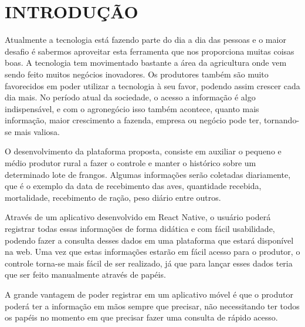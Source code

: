 
\chapter{INTRODUÇÃO}
\label{chap:introducao}


Atualmente a tecnologia está fazendo parte do dia a dia das pessoas e o maior desafio é sabermos aproveitar esta ferramenta que nos proporciona muitas coisas boas. A tecnologia tem movimentado bastante a área da agricultura onde vem sendo feito muitos negócios inovadores. Os produtores também são muito favorecidos em poder utilizar a tecnologia à seu favor, podendo assim crescer cada dia mais. 
No período atual da sociedade, o acesso a informação é algo indispensável, e com o agronegócio isso também acontece, quanto mais informação, maior crescimento a fazenda, empresa ou negócio pode ter, tornando-se mais valiosa. 

O desenvolvimento da plataforma proposta, consiste em auxiliar o pequeno e médio produtor rural a fazer o controle e manter o histórico sobre um determinado lote de frangos. Algumas informações serão coletadas diariamente, que é o exemplo da data de recebimento das aves, quantidade recebida, mortalidade, recebimento de ração, peso diário entre outros. 

Através de um aplicativo desenvolvido em React Native, o usuário poderá registrar todas essas informações de forma didática e com fácil usabilidade, podendo fazer a consulta desses dados em uma plataforma que estará disponível na web.
Uma vez que estas informações estarão em fácil acesso para o produtor, o controle torna-se mais fácil de ser realizado, já que para lançar esses dados teria que ser feito manualmente através de papéis. 

A grande vantagem de poder registrar em um aplicativo móvel é que o produtor poderá ter a informação em mãos sempre que precisar, não necessitando ter todos os papéis no momento em que precisar fazer uma consulta de rápido acesso.
